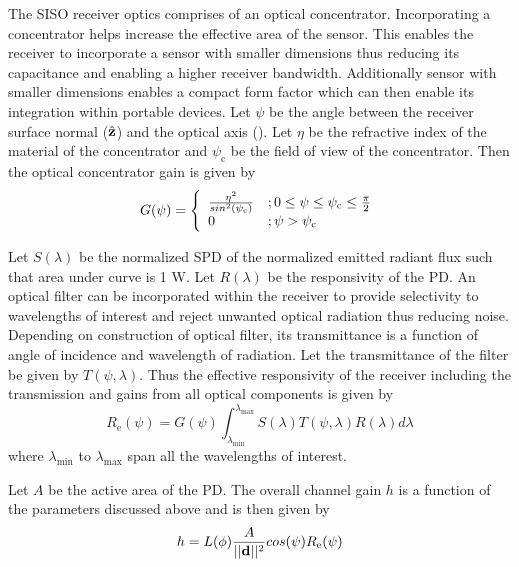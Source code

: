The SISO receiver optics comprises of an optical concentrator. Incorporating a concentrator helps increase the effective area of the sensor. This enables the receiver to incorporate a sensor with smaller dimensions thus reducing its capacitance and enabling a higher receiver bandwidth. Additionally sensor with smaller dimensions enables a compact form factor which can then enable its integration within portable devices. Let $\psi$ be the angle between the receiver surface normal ($\hat{\bf{z}}$) and the optical axis (). Let $\eta$ be the refractive index of the material of the concentrator and $\psi_{\text{c}}$ be the field of view of the concentrator. Then the optical concentrator gain is given by
\begin{equation}
	\label{eqOpGain}
	G(\psi) = \left\{ \begin{array}{ll} \frac{\eta^{2}}{sin^{2}(\psi_{\text{c}})} &; 0\leq\psi\leq\psi_{\text{c}}\leq\frac{\pi}{2} \\ 0 &; \psi>\psi_{\text{c}} \end{array} \right.
\end{equation}

Let $S(\lambda)$ be the normalized SPD of the normalized emitted radiant flux such that area under curve is 1 W. Let $R(\lambda)$ be the responsivity of the PD. An optical filter can be incorporated within the receiver to provide selectivity to wavelengths of interest and reject unwanted optical radiation thus reducing noise. Depending on construction of optical filter, its transmittance is a function of angle of incidence and wavelength of radiation. Let the transmittance of the filter be given by $T(\psi,\lambda)$. Thus the effective responsivity of the receiver including the transmission and gains from all optical components is given by 
\begin{equation}
	\label{eqReff}
	R_{\text{e}}(\psi) = G(\psi)\int^{\lambda_{\text{max}}}_{\lambda_{\text{min}}}S(\lambda)T(\psi,\lambda)R(\lambda)d\lambda
\end{equation}
where $\lambda_{\text{min}}$ to $\lambda_{\text{max}}$ span all the wavelengths of interest.

Let $A$ be the active area of the PD. The overall channel gain $h$ is a function of the parameters discussed above and is then given by
\begin{equation}
	\label{eqChGain}
	h = L(\phi)\frac{A}{||{\bf{d}}||^{2}}cos(\psi)R_{\text{e}}(\psi)
\end{equation}

